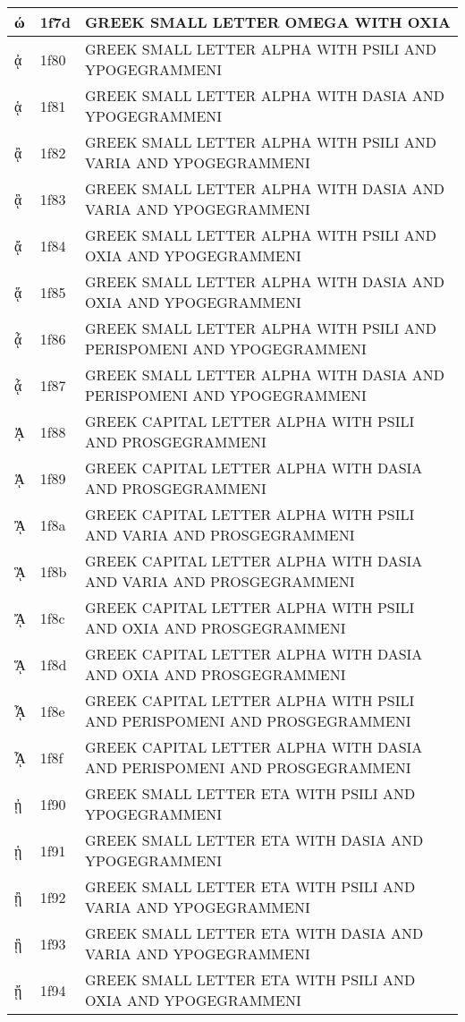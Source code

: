 \documentclass[12pt,letterpaper,openany]{book}
\begin{document}
\begin{center}
\begin{supertabular}{|m{0.25in}|m{0.5in}|m{4in}|}
ώ & 1f7d & GREEK SMALL LETTER OMEGA WITH OXIA\\\hline
ᾀ & 1f80 & GREEK SMALL LETTER ALPHA WITH PSILI AND YPOGEGRAMMENI\\\hline
ᾁ & 1f81 & GREEK SMALL LETTER ALPHA WITH DASIA AND YPOGEGRAMMENI\\\hline
ᾂ & 1f82 & GREEK SMALL LETTER ALPHA WITH PSILI AND VARIA AND YPOGEGRAMMENI\\\hline
ᾃ & 1f83 & GREEK SMALL LETTER ALPHA WITH DASIA AND VARIA AND YPOGEGRAMMENI\\\hline
ᾄ & 1f84 & GREEK SMALL LETTER ALPHA WITH PSILI AND OXIA AND YPOGEGRAMMENI\\\hline
ᾅ & 1f85 & GREEK SMALL LETTER ALPHA WITH DASIA AND OXIA AND YPOGEGRAMMENI\\\hline
ᾆ & 1f86 & GREEK SMALL LETTER ALPHA WITH PSILI AND PERISPOMENI AND YPOGEGRAMMENI\\\hline
ᾇ & 1f87 & GREEK SMALL LETTER ALPHA WITH DASIA AND PERISPOMENI AND YPOGEGRAMMENI\\\hline
ᾈ & 1f88 & GREEK CAPITAL LETTER ALPHA WITH PSILI AND PROSGEGRAMMENI\\\hline
ᾉ & 1f89 & GREEK CAPITAL LETTER ALPHA WITH DASIA AND PROSGEGRAMMENI\\\hline
ᾊ & 1f8a & GREEK CAPITAL LETTER ALPHA WITH PSILI AND VARIA AND PROSGEGRAMMENI\\\hline
ᾋ & 1f8b & GREEK CAPITAL LETTER ALPHA WITH DASIA AND VARIA AND PROSGEGRAMMENI\\\hline
ᾌ & 1f8c & GREEK CAPITAL LETTER ALPHA WITH PSILI AND OXIA AND PROSGEGRAMMENI\\\hline
ᾍ & 1f8d & GREEK CAPITAL LETTER ALPHA WITH DASIA AND OXIA AND PROSGEGRAMMENI\\\hline
ᾎ & 1f8e & GREEK CAPITAL LETTER ALPHA WITH PSILI AND PERISPOMENI AND PROSGEGRAMMENI\\\hline
ᾏ & 1f8f & GREEK CAPITAL LETTER ALPHA WITH DASIA AND PERISPOMENI AND PROSGEGRAMMENI\\\hline
ᾐ & 1f90 & GREEK SMALL LETTER ETA WITH PSILI AND YPOGEGRAMMENI\\\hline
ᾑ & 1f91 & GREEK SMALL LETTER ETA WITH DASIA AND YPOGEGRAMMENI\\\hline
ᾒ & 1f92 & GREEK SMALL LETTER ETA WITH PSILI AND VARIA AND YPOGEGRAMMENI\\\hline
ᾓ & 1f93 & GREEK SMALL LETTER ETA WITH DASIA AND VARIA AND YPOGEGRAMMENI\\\hline
ᾔ & 1f94 & GREEK SMALL LETTER ETA WITH PSILI AND OXIA AND YPOGEGRAMMENI\\\hline

\end{supertabular}
\end{center}
\end{document}
